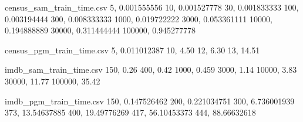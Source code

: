 \begin{filecontents*}{census_sam_train_time.csv}
    5, 0.001555556
    10, 0.001527778
    30, 0.001833333
    100, 0.003194444
    300, 0.008333333
    1000, 0.019722222
    3000, 0.053361111
    10000, 0.194888889
    30000, 0.311444444
    100000, 0.945277778
\end{filecontents*}
\begin{filecontents*}{census_pgm_train_time.csv}
    5, 0.011012387
    10, 4.50
    12, 6.30
    13, 14.51
\end{filecontents*}
\begin{filecontents*}{imdb_sam_train_time.csv}
    150, 0.26
    400, 0.42
    1000, 0.459
    3000, 1.14
    10000, 3.83
    30000, 11.77
    100000, 35.42
\end{filecontents*}
\begin{filecontents*}{imdb_pgm_train_time.csv}
    150, 0.147526462
    200, 0.221034751
    300, 6.736001939
    373, 13.54637885
    400, 19.49776269
    417, 56.10453373
    444, 88.66632618
\end{filecontents*}
